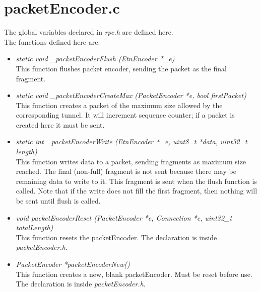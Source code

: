 \section{packetEncoder.c}
The global variables declared in \emph{rpc.h} are defined here.\\
The functions defined here are:
\begin{itemize}

\item \emph{static void \_packetEncoderFlush (EtnEncoder *\_e)}\\
This function flushes packet encoder, sending the packet as the final fragment.

\item \emph{static void \_packetEncoderCreateMax (PacketEncoder *e, bool firstPacket)}\\
This function creates a packet of the maximum size allowed by the corresponding tunnel. It will increment sequence counter; if a packet is created here it must be sent.

\item \emph{static int \_packetEncoderWrite (EtnEncoder *\_e, uint8\_t *data, uint32\_t length)}\\
This function writes data to a packet, sending fragments as maximum size reached. The final (non-full) fragment is not sent because there may be remaining data to write to it. This fragment is sent when the flush function is called. Note that if the write does not fill the first fragment, then nothing will be sent until flush is called.

\item \emph{void packetEncoderReset (PacketEncoder *e, Connection *c, uint32\_t totalLength)}\\
This function resets the packetEncoder. The declaration is inside \emph{packetEncoder.h}.

\item \emph{PacketEncoder *packetEncoderNew()}\\
This function creates a new, blank packetEncoder. Must be reset before use. The declaration is inside \emph{packetEncoder.h}.

\end{itemize}
